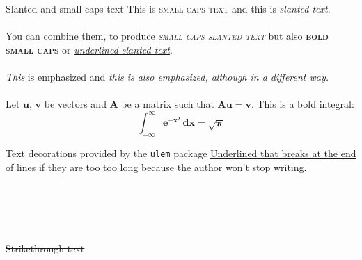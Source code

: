 \documentclass{beamer}
\begin{document}
\begin{frame}{Slanted and small caps text}
This is \textsc{small caps text} and this is
\textsl{slanted text}.\\~\\
You can combine them, to produce \textsl{\textsc{small
caps slanted text}} but also \textsc{\textbf{bold small caps}} or \textsl{\underline{underlined slanted text}}.\\~\\


\emph{This} is emphasized and \textit{\emph{this} is
also emphasized, although in a different way.}\\~\\


Let $\bm{u}$, $\bm{v}$ be vectors and $\bm{A}$ be a
matrix such that $\bm{Au}=\bm{v}$.
This is a bold integral:
\[
\bm{\int_{-\infty}^{\infty} e^{-x^2}\,dx=\sqrt{\pi} }
\]
\end{frame}

\begin{frame}{Text decorations provided by the \texttt{ulem} package}
\uline{Underlined that breaks at the end of lines if they are too too long because the author won’t stop writing.} \\~\\
 \\~\\
 \\~\\
\sout{Strikethrough text} \\~\\
 \\~\\
 \\~\\
\end{frame}
\end{document}
